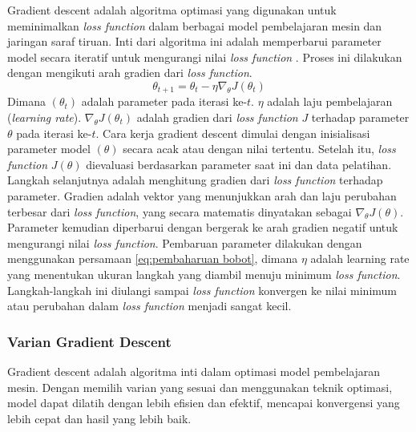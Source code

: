 Gradient descent adalah algoritma optimasi yang digunakan untuk meminimalkan \textit{loss function} dalam berbagai model pembelajaran mesin dan jaringan saraf tiruan. Inti dari algoritma ini adalah memperbarui parameter model secara iteratif untuk mengurangi nilai \textit{loss function} \cite{bishop_2006}. Proses ini dilakukan dengan mengikuti arah gradien dari \textit{loss function}.
\begin{equation}
    \theta_{t+1} = \theta_t - \eta \nabla_\theta J(\theta_t)
    \label{eq:pembaharuan bobot}
\end{equation}
Dimana $(\theta_t)$ adalah parameter pada iterasi ke-\(t\). \(\eta\) adalah laju pembelajaran (\textit{learning rate}). \(\nabla_\theta J(\theta_t)\) adalah gradien dari \textit{loss function} \(J\) terhadap parameter \(\theta\) pada iterasi ke-\(t\). Cara kerja gradient descent dimulai dengan inisialisasi parameter model $(\theta)$ secara acak atau dengan nilai tertentu. Setelah itu, \textit{loss function} $J(\theta)$ dievaluasi berdasarkan parameter saat ini dan data pelatihan. Langkah selanjutnya adalah menghitung gradien dari \textit{loss function} terhadap parameter. Gradien adalah vektor yang menunjukkan arah dan laju perubahan terbesar dari \textit{loss function}, yang secara matematis dinyatakan sebagai $\nabla_\theta J(\theta)$. Parameter kemudian diperbarui dengan bergerak ke arah gradien negatif untuk mengurangi nilai \textit{loss function}. Pembaruan parameter dilakukan dengan menggunakan persamaan \ref{eq:pembaharuan bobot}, dimana $\eta$ adalah learning rate yang menentukan ukuran langkah yang diambil menuju minimum \textit{loss function}. Langkah-langkah ini diulangi sampai \textit{loss function} konvergen ke nilai minimum atau perubahan dalam \textit{loss function} menjadi sangat kecil.

\subsubsection{Varian Gradient Descent}
Gradient descent adalah algoritma inti dalam optimasi model pembelajaran mesin. Dengan memilih varian yang sesuai dan menggunakan teknik optimasi, model dapat dilatih dengan lebih efisien dan efektif, mencapai konvergensi yang lebih cepat dan hasil yang lebih baik.

